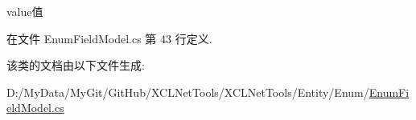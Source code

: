 value值 



在文件 Enum\-Field\-Model.\-cs 第 43 行定义.



该类的文档由以下文件生成\-:\begin{DoxyCompactItemize}
\item 
D\-:/\-My\-Data/\-My\-Git/\-Git\-Hub/\-X\-C\-L\-Net\-Tools/\-X\-C\-L\-Net\-Tools/\-Entity/\-Enum/\hyperlink{_enum_field_model_8cs}{Enum\-Field\-Model.\-cs}\end{DoxyCompactItemize}

